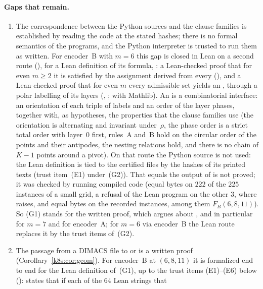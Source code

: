 \paragraph{Gaps that remain.}
\begin{enumerate}[label=(G\arabic*)]
\item The correspondence between the Python sources and the clause families is established by reading the code at the
stated hashes; there is no formal semantics of the programs, and the Python interpreter is trusted to run them as
written. For encoder~B with $m=6$ this gap is closed in Lean on a second route (), for a Lean
definition of its formula, : a Lean-checked proof that for even $m\ge2$ it is satisfied by the
assignment derived from every  (), and a Lean-checked proof that for even
$m$ every admissible set yields an , through a polar labelling of its layers
(, ; with Mathlib). An  is a combinatorial interface: an orientation of
each triple of labels and an order of the layer phases, together with, as hypotheses, the properties that the clause
families use (the orientation is alternating and invariant under~$\rho$, the phase order is a strict total order with
layer~$0$ first, rules~A and~B hold on the circular order of the points and their antipodes, the nesting relations
hold, and there is no chain of $K-1$ points around a pivot). On that route the Python source is not used: the Lean
definition is tied to the certified files by the hashes of its printed texts (trust item~(E1) under~(G2)). That
 equals the output of
 is not proved; it was checked by running compiled code (equal bytes on $222$ of the $225$ instances
of a small grid, a refusal of the Lean program on the other $3$, where  raises, and equal bytes on the
recorded instances, among them $F_B(6,8,11)$). So (G1) stands for the written proof, which argues about
, and in particular for $m=7$ and for encoder~A; for $m=6$ via encoder~B the Lean route replaces it by
the trust items of~(G2).
\item The passage from a DIMACS file to  or  is a written proof
(Corollary~\ref{k8s:cor:geom}). For encoder~B at $(6,8,11)$ it is formalized end to end for the Lean definition
of~(G1), up to the trust items (E1)--(E6) below ():  states that if each of the $64$ Lean strings that

\end{enumerate}
